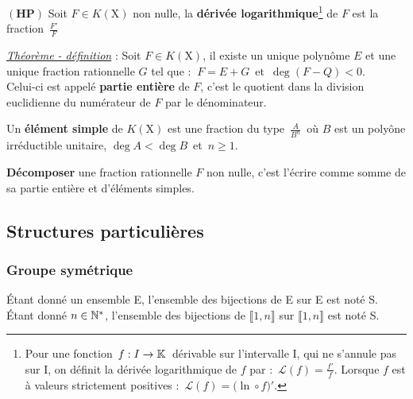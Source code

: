 \vspace{0.3cm}

$\left(\mathbf{HP}\right)$ Soit \(F\in K(\text{X})\) non nulle, la \textbf{dérivée logarithmique}\footnote{Pour une fonction \(\,f:I\to\mathbb{K}\,\) dérivable sur l'intervalle I, qui ne s'annule pas sur I, on définit la dérivée logarithmique de $f$ par : \(\,\displaystyle \mathcal{L}(f)=\frac{f'}{f}\). Lorsque $f$ est à valeurs strictement positives : \(\,\mathcal{L}(f)=\bigl(\ln\circ f\bigr)'\).} de $F$ est la fraction \(\,\displaystyle\frac{F'}{F}\)

\vspace{1cm}

\underline{\emph{Théorème - définition}} : Soit $F\in K(\text{X})$, il existe un unique polynôme $E$ et une unique fraction rationnelle $G$ tel que : $\ F=E+G\,$ et $\,\deg (F-Q)<0$. \\Celui-ci est appelé \textbf{partie entière} de $F$, c'est le quotient dans la division euclidienne du numérateur de $F$ par le dénominateur.

\vspace{0.5cm}

Un \textbf{élément simple} de \(K(\text{X})\) est une fraction du type \(\,\displaystyle\frac{A}{B^n}\,\) où $B$ est un polyône irréductible unitaire, \(\deg A < \deg B\,\) et \(\,n\geq 1\).

\vspace{1cm}

\textbf{Décomposer} une fraction rationnelle $F$ non nulle, c'est l'écrire comme somme de sa partie entière et d'éléments simples.

\newpage

\subsection{Structures particulières}

\vspace{0.7cm}

\subsubsection{Groupe symétrique}

\vspace{0.7cm}

Étant donné un ensemble E, l'ensemble des bijections de E sur E est noté S.\\
Étant donné \(n\in \mathbb{N}^*\), l'ensemble des bijections de \(\llbracket 1,n\rrbracket\) sur \(\llbracket 1,n\rrbracket\) est noté S.

